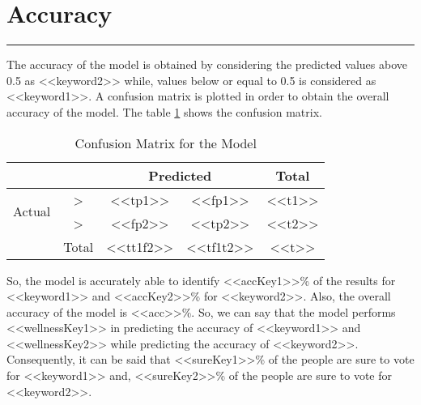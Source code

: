 \documentclass[a4paper,12pt, notitlepage]{article}
\begin{document}
\section{Accuracy}
\rule{\textwidth}{0.5pt}
\par
The accuracy of the model is obtained by considering the predicted values above 0.5 as <<keyword2>> while, values below or equal to 0.5 is considered as <<keyword1>>. A confusion matrix is plotted in order to obtain the overall accuracy of the model. The table \ref{table:7} shows the confusion matrix.

\begin{table}[!htbp]
\centering
\begin{tabular}{cc|c|c|c|} \cline{3-5}
 & & \multicolumn{2}{c|}{\cellcolor{Gray!50}Predicted} & \cellcolor{Gray!50}Total \\[1ex] \hline
\multicolumn{1}{|c|}{\multirow{2}{*}{ \cellcolor{Gray!50}Actual}} & > & <<tp1>> & <<fp1>> & <<t1>> \\[1ex]
\multicolumn{1}{|c|}{\cellcolor{Gray!50} } & > & <<fp2>> & <<tp2>> & <<t2>> \\[1ex] \hline
\multicolumn{1}{c|}{} & \cellcolor{Gray!50} Total & <<tt1f2>> & <<tf1t2>> & <<t>> \\[1ex] \cline{2-5}
\end{tabular}
\caption{Confusion Matrix for the Model}
\label{table:7}
\end{table}

So, the model is accurately able to identify <<accKey1>>\% of the results for <<keyword1>> and <<accKey2>>\% for <<keyword2>>. Also, the overall accuracy of the model is <<acc>>\%. So, we can say that the model performs <<wellnessKey1>> in predicting the accuracy of <<keyword1>> and <<wellnessKey2>> while predicting the accuracy of <<keyword2>>. Consequently, it can be said that <<sureKey1>>\% of the people are sure to vote for <<keyword1>> and, <<sureKey2>>\% of the people are sure to vote for <<keyword2>>.
\end{document}
